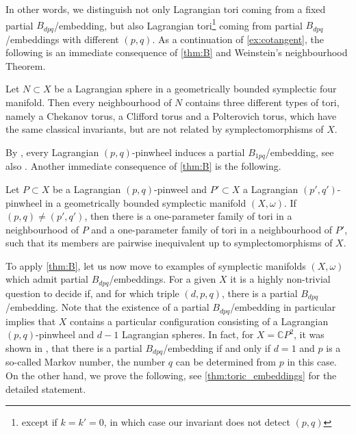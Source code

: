 \documentclass[12pt,a4paper,abstract=true,final]{scrartcl}
\begin{document}
In other words, we distinguish not only Lagrangian tori coming from a fixed partial $B_{dpq}$\-/embedding, but also Lagrangian tori\footnote{except if $k=k'=0$, in which case our invariant does not detect $(p,q)$} coming from partial $B_{dpq}$\-/embeddings with different $(p,q)$.
As a continuation of \cref{ex:cotangent}, the following is an immediate consequence of \cref{thm:B} and Weinstein's neighbourhood Theorem.

\begin{corollary}
    \label{thm:lag_sphere}
    Let $N \subset X$ be a Lagrangian sphere in a geometrically bounded symplectic four manifold.
    Then every neighbourhood of $N$ contains three different types of tori, namely a Chekanov torus, a Clifford torus and a Polterovich torus, which have the same classical invariants, but are not related by symplectomorphisms of $X$.
\end{corollary}

By \cite{Kho13}, every Lagrangian $(p,q)$-pinwheel induces a partial $B_{1pq}$\-/embedding, see also \cite[Definition 2.10]{EvaSmi18}.
Another immediate consequence of \cref{thm:B} is the following.

\begin{corollary}
    \label{thm:pinwheels}
    Let $P \subset X$ be a Lagrangian $(p,q)$-pinweel and $P' \subset X$ a Lagrangian $(p',q')$-pinwheel in a geometrically bounded symplectic manifold $(X,\omega)$.
    If $(p,q) ≠ (p',q')$, then there is a one-parameter family of tori in a neighbourhood of $P$ and a one-parameter family of tori in a neighbourhood of $P'$, such that its members are pairwise inequivalent up to symplectomorphisms of $X$.
\end{corollary}

To apply \cref{thm:B}, let us now move to examples of symplectic manifolds $(X,\omega)$ which admit partial $B_{dpq}$\-/embeddings.
For a given $X$ it is a highly non-trivial question to decide if, and for which triple $(d,p,q)$, there is a partial $B_{dpq}$\-/embedding.
Note that the existence of a partial $B_{dpq}$\-/embedding in particular implies that $X$ contains a particular configuration consisting of a Lagrangian $(p,q)$-pinwheel and $d-1$ Lagrangian spheres.
In fact, for $X = \mathbb{C}P^2$, it was shown in \cite{EvaSmi18}, that there is a partial $B_{dpq}$\-/embedding if and only if $d=1$ and $p$ is a so-called Markov number, the number $q$ can be determined from $p$ in this case.
On the other hand, we prove the following, see \cref{thm:toric_embeddings} for the detailed statement.
\end{document}
